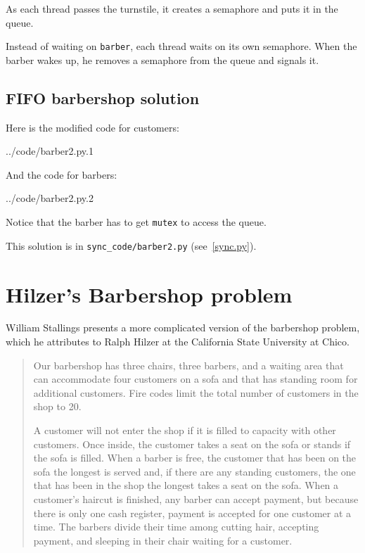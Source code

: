 \documentclass{book}
\newcommand{\clearemptydoublepage}{\newpage\cleardoublepage}
\begin{document}
As each thread passes the turnstile, it creates a semaphore and puts it
in the queue.

Instead of waiting on {\tt barber}, each thread waits on its own
semaphore.  When the barber wakes up, he removes a semaphore from the queue and
signals it.


\clearemptydoublepage
\subsection{FIFO barbershop solution}

Here is the modified code for customers:


{../code/barber2.py.1}

And the code for barbers:


{../code/barber2.py.2}

Notice that the barber has to get {\tt mutex} to access the
queue.

This solution is in \verb"sync_code/barber2.py" (see~\ref{sync.py}).


\clearemptydoublepage
\section {Hilzer's Barbershop problem}

William Stallings \cite{stallings} presents a more complicated version
of the barbershop problem, which he attributes to Ralph Hilzer at the
California State University at Chico.

\begin{quotation}
Our barbershop has three chairs, three barbers, and a waiting
area that can accommodate four customers on a sofa and that has
standing room for additional customers.  Fire codes limit the
total number of customers in the shop to 20.

A customer will not enter the shop if it is filled to capacity with
other customers.  Once inside, the customer takes a seat on the sofa
or stands if the sofa is filled.  When a barber is free, the customer
that has been on the sofa the longest is served and, if there are any
standing customers, the one that has been in the shop the longest
takes a seat on the sofa.  When a customer's haircut is finished, any
barber can accept payment, but because there is only one cash
register, payment is accepted for one customer at a time.  The barbers
divide their time among cutting hair, accepting payment, and sleeping
in their chair waiting for a customer.
\end{quotation}
\end{document}
